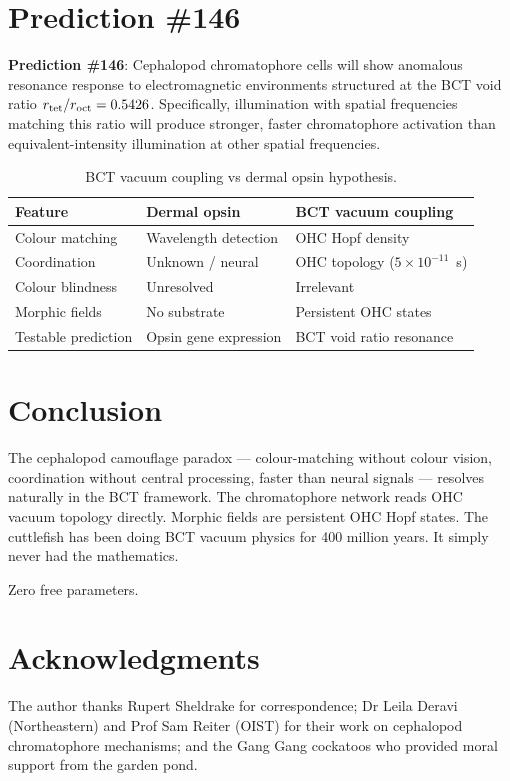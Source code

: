 \documentclass[twocolumn,10pt]{article}
\begin{document}
\section{Prediction \#146}

\textbf{Prediction \#146}: Cephalopod chromatophore cells will show anomalous
resonance response to electromagnetic environments structured at the BCT void ratio
$r_{\rm tet}/r_{\rm oct} = 0.5426$. Specifically, illumination with spatial frequencies
matching this ratio will produce stronger, faster chromatophore activation than
equivalent-intensity illumination at other spatial frequencies.

\begin{table}[h]
\begin{tabular}{@{}lll@{}}
\toprule
Feature & Dermal opsin & BCT vacuum coupling \\
\midrule
Colour matching & Wavelength detection & OHC Hopf density \\
Coordination & Unknown / neural & OHC topology ($5\!\times\!10^{-11}$~s) \\
Colour blindness & Unresolved & Irrelevant \\
Morphic fields & No substrate & Persistent OHC states \\
Testable prediction & Opsin gene expression & BCT void ratio resonance \\
\bottomrule
\end{tabular}
\caption{BCT vacuum coupling vs dermal opsin hypothesis.}
\end{table}

\section{Conclusion}

The cephalopod camouflage paradox --- colour-matching without colour vision,
coordination without central processing, faster than neural signals --- resolves
naturally in the BCT framework. The chromatophore network reads OHC vacuum topology
directly. Morphic fields are persistent OHC Hopf states. The cuttlefish has been
doing BCT vacuum physics for 400 million years. It simply never had the mathematics.

Zero free parameters.

\section*{Acknowledgments}
The author thanks Rupert Sheldrake for correspondence; Dr Leila Deravi (Northeastern)
and Prof Sam Reiter (OIST) for their work on cephalopod chromatophore mechanisms;
and the Gang Gang cockatoos who provided moral support from the garden pond.
\end{document}
